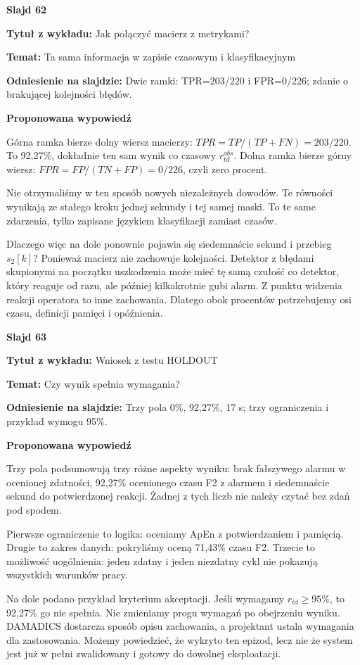 \documentclass[a4paper,11pt]{article}
\newcommand{\NumerSlajdu}{1}
\newcommand{\Komentarz}[3]{%
  \gdef\NumerSlajdu{#1}%
  {\Large\bfseries Slajd #1\par}\smallskip
  \textbf{Tytuł z wykładu:} #2\par
  \textbf{Temat:} #3\par\medskip
}
\begin{document}
\Komentarz{62}{Jak połączyć macierz z metrykami?}{Ta sama informacja w zapisie czasowym i klasyfikacyjnym}
{\small\color{black!65}\textbf{Odniesienie na slajdzie:} Dwie ramki: TPR=203/220 i FPR=0/226; zdanie o brakującej kolejności błędów.\par}
\medskip
\textbf{Proponowana wypowiedź}\par
Górna ramka bierze dolny wiersz macierzy: $TPR=TP/(TP+FN)=203/220$. To 92,27\%, dokładnie ten sam wynik co czasowy $r_{td}^{obs}$. Dolna ramka bierze górny wiersz: $FPR=FP/(TN+FP)=0/226$, czyli zero procent.

Nie otrzymaliśmy w ten sposób nowych niezależnych dowodów. Te równości wynikają ze stałego kroku jednej sekundy i tej samej maski. To te same zdarzenia, tylko zapisane językiem klasyfikacji zamiast czasów.

Dlaczego więc na dole ponownie pojawia się siedemnaście sekund i przebieg $s_2[k]$? Ponieważ macierz nie zachowuje kolejności. Detektor z błędami skupionymi na początku uszkodzenia może mieć tę samą czułość co detektor, który reaguje od razu, ale później kilkakrotnie gubi alarm. Z punktu widzenia reakcji operatora to inne zachowania. Dlatego obok procentów potrzebujemy osi czasu, definicji pamięci i opóźnienia.
\clearpage

\Komentarz{63}{Wniosek z testu HOLDOUT}{Czy wynik spełnia wymagania?}
{\small\color{black!65}\textbf{Odniesienie na slajdzie:} Trzy pola 0\%, 92,27\%, 17 s; trzy ograniczenia i przykład wymogu 95\%.\par}
\medskip
\textbf{Proponowana wypowiedź}\par
Trzy pola podsumowują trzy różne aspekty wyniku: brak fałszywego alarmu w ocenionej zdatności, 92,27\% ocenionego czasu F2 z alarmem i siedemnaście sekund do potwierdzonej reakcji. Żadnej z tych liczb nie należy czytać bez zdań pod spodem.

Pierwsze ograniczenie to logika: oceniamy ApEn z potwierdzaniem i pamięcią. Drugie to zakres danych: pokryliśmy oceną 71,43\% czasu F2. Trzecie to możliwość uogólnienia: jeden zdatny i jeden niezdatny cykl nie pokazują wszystkich warunków pracy.

Na dole podano przykład kryterium akceptacji. Jeśli wymagamy $r_{td}\geq95\%$, to 92,27\% go nie spełnia. Nie zmieniamy progu wymagań po obejrzeniu wyniku. DAMADICS dostarcza sposób opisu zachowania, a projektant ustala wymagania dla zastosowania. Możemy powiedzieć, że wykryto ten epizod, lecz nie że system jest już w pełni zwalidowany i gotowy do dowolnej eksploatacji.
\clearpage
\end{document}
